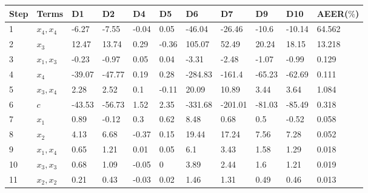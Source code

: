 \begin{tabular}{lllllllllll}
Step & Terms & D1 & D2 & D4 & D5 & D6 & D7 & D9 & D10 & AEER($\%$) \\ 
\hline 
1 & $x_4,x_4$ & -6.27 & -7.55 & -0.04 & 0.05 & -46.04 & -26.46 & -10.6 & -10.14 & 64.562 \\ 
2 & $x_3$ & 12.47 & 13.74 & 0.29 & -0.36 & 105.07 & 52.49 & 20.24 & 18.15 & 13.218 \\ 
3 & $x_1,x_3$ & -0.23 & -0.97 & 0.05 & 0.04 & -3.31 & -2.48 & -1.07 & -0.99 & 0.129 \\ 
4 & $x_4$ & -39.07 & -47.77 & 0.19 & 0.28 & -284.83 & -161.4 & -65.23 & -62.69 & 0.111 \\ 
5 & $x_3,x_4$ & 2.28 & 2.52 & 0.1 & -0.11 & 20.09 & 10.89 & 3.44 & 3.64 & 1.084 \\ 
6 & $c$ & -43.53 & -56.73 & 1.52 & 2.35 & -331.68 & -201.01 & -81.03 & -85.49 & 0.318 \\ 
7 & $x_1$ & 0.89 & -0.12 & 0.3 & 0.62 & 8.48 & 0.68 & 0.5 & -0.52 & 0.058 \\ 
8 & $x_2$ & 4.13 & 6.68 & -0.37 & 0.15 & 19.44 & 17.24 & 7.56 & 7.28 & 0.052 \\ 
9 & $x_1,x_4$ & 0.65 & 1.21 & 0.01 & 0.05 & 6.1 & 3.43 & 1.58 & 1.29 & 0.018 \\ 
10 & $x_3,x_3$ & 0.68 & 1.09 & -0.05 & 0 & 3.89 & 2.44 & 1.6 & 1.21 & 0.019 \\ 
11 & $x_2,x_2$ & 0.21 & 0.43 & -0.03 & 0.02 & 1.46 & 1.31 & 0.49 & 0.46 & 0.013 \\ 
\hline 
\end{tabular}